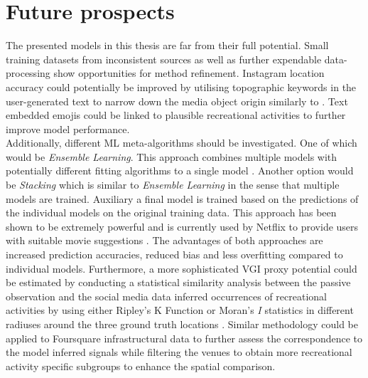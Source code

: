 \section{Future prospects} \label{future_prospects}
The presented models in this thesis are far from their full potential. Small training datasets from inconsistent sources as well as further expendable data-processing show opportunities for method refinement. Instagram location accuracy could potentially be improved by utilising topographic keywords in the user-generated text to narrow down the media object origin similarly to \parencite{Ostermann2015}. Text embedded emojis could be linked to plausible recreational activities to further improve model performance.\\
Additionally, different ML meta-algorithms should be investigated. One of which would be \textit{Ensemble Learning}. This approach combines multiple models with potentially different fitting algorithms to a single model \parencite{Zhou2009}. Another option would be \textit{Stacking} which is similar to \textit{Ensemble Learning} in the sense that multiple models are trained. Auxiliary a final model is trained based on the predictions of the individual models on the original training data. This approach has been shown to be extremely powerful and is currently used by Netflix to provide users with suitable movie suggestions \parencite{AndreasToscher2009}. The advantages of both approaches are increased prediction accuracies, reduced bias and less overfitting compared to individual models. Furthermore, a more sophisticated VGI proxy potential could be estimated by conducting a statistical similarity analysis between the passive observation and the social media data inferred occurrences of recreational activities by using either Ripley's K Function or Moran's \textit{I} statistics in different radiuses around the three ground truth locations \parencite{OSullivan2003}. Similar methodology could be applied to Foursquare infrastructural data to further assess the correspondence to the model inferred signals while filtering the venues to obtain more recreational activity specific subgroups to enhance the spatial comparison. 



